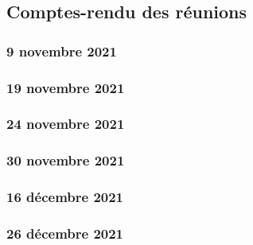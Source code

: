 \subsection{Comptes-rendu des réunions}
    
    \subsubsection{9 novembre 2021}
    
    
    \newpage
    \subsubsection{19 novembre 2021}
    
    
    \newpage
    \subsubsection{24 novembre 2021}
    
    
    \newpage
    \subsubsection{30 novembre 2021}
    
    
    \newpage
    \subsubsection{16 décembre 2021}
    

    \newpage
    \subsubsection{26 décembre 2021}
    